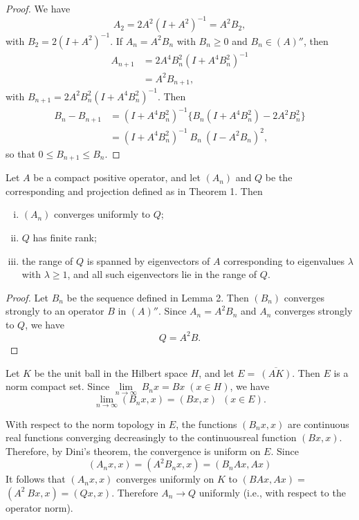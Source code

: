 \begin{proof}
  We have 
  $$
  A_2 = 2A^2 (I + A^2)^{-1} = A^2 B_2,
  $$
  with $B_2 = 2 (I + A^2)^{-1}$. If $A_n = A^2 B_n$ with $B_n \ge 0$
  and $B_n \in (A)''$, then 
  \begin{align*}
    A_{n+1} &= 2A^4 B^2_n (I + A^4 B^2_n)^{-1}\\
    &= A^2 B_{n+1},
  \end{align*}
  with $B_{n+1} = 2A^2 B^2_n (I + A^4 B^2_n)^{-1}$. Then
  \begin{align*}
    B_n - B_{n+1} &= (I + A^4 B^2_n)^{-1} \big \{ B_n (I + A^4 B^2_n)
    -2A^2 B^2_n \big \} \\ 
    &= (I + A^4 B^2_n)^{-1} ~ B_n ~ (I - A^2 B_n)^2,
  \end{align*}\pageoriginale
  so that \qquad $0 \leq B_{n+1} \leq B_n$.
\end{proof}

\begin{thmm}\label{chap6:thm6.3} %
  Let $A$ be a compact positive operator, and let $(A_n)$ and  $Q$ be
  the corresponding and projection defined as in Theorem 1. Then  
  \begin{enumerate}[(i)]
  \item $(A_n)$ converges uniformly to $Q$;

  \item $Q$ has finite rank;

  \item the range of $Q$ is spanned by eigenvectors of $A$
    corresponding to eigenvalues $\lambda$ with $\lambda \ge 1$, and
    all such eigenvectors lie in the range of $Q$. 
  \end{enumerate}
\end{thmm}

\begin{proof}
  Let $B_n$ be the sequence defined in Lemma 2. Then $(B_n)$
  converges strongly to an operator $B$ in $(A)''$. Since $A_n = A^2
  B_n$ and $A_n$ converges strongly to $Q$, we have 
  $$
  Q = A^2 B.
  $$
\end{proof}

Let $K$ be the unit ball in the Hilbert space $H$, and let $E = ~
\overline{(AK)}$. Then $E$ is  a norm compact set. Since $\lim
\limits_{n \to \infty} ~ B_n x = Bx \; (x \in H)$, we have  
$$
\lim_{n \to \infty} (B_n x, x) = (Bx,x) \; ~ (x \in E).
$$

With respect to the norm topology in $E$, the functions $(B_n x ,x)$
are continuous real functions converging decreasingly to the
continuous\pageoriginale real function $(Bx,x)$. Therefore, by Dini's
theorem, the convergence is uniform on $E$. Since 
$$
(A_n x,x) = (A^2 B_n x,x) = (B_n Ax, Ax)
$$
It follows that  $(A_n x,x)$ converges uniformly on $K$ to $(BAx, Ax)
=$ \break  $(A^2 ~ Bx,x) = (Qx,x)$. Therefore $A_n \to Q$ uniformly
(i.e., with respect to the operator norm). 

